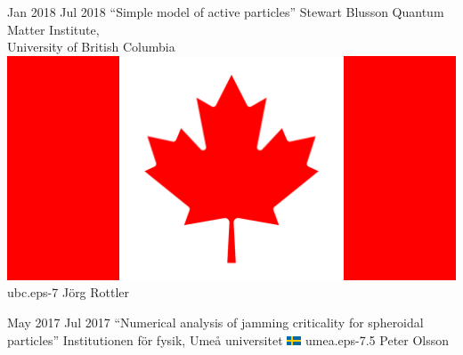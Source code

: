 \documentclass[a4paper]{cvtemplate_en} %
\begin{document}
\begin{cvbody}
\cvitem
	{Jan 2018}
	{Jul 2018}
  {``Simple model of active particles''}
  {Stewart Blusson Quantum Matter Institute,\\ University of British Columbia \includegraphics[height=0.8\myheight]{ca}}
  {ubc.eps}{}{-7}
  {J\"org Rottler}
  {\\
  }

\cvitem
	{May 2017}
	{Jul 2017}
	{``Numerical analysis of jamming criticality for spheroidal particles''}
	{Institutionen f\"{o}r fysik, Ume\r{a} universitet \includegraphics[height=0.8\myheight]{se}}
	{umea.eps}{}{-7.5}
	{Peter Olsson}
	{\\
	}


\end{cvbody}
\end{document}
